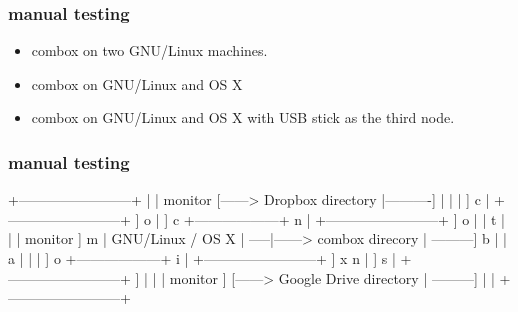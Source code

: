 \begin{frame}
  \frametitle{manual testing}
  \begin{itemize}
  \item combox on two GNU/Linux machines.
  \item combox on GNU/Linux and OS X
  \item combox on GNU/Linux and OS X with USB stick as the third node.
  \end{itemize}
\end{frame}


\begin{frame}[fragile]
  \frametitle{manual testing}
  {\tiny
  \begin{semiverbatim}



                                   +------------------------+
                                   |                        | monitor
                            [------>   Dropbox directory    |----------]
                            |      |                        |          ]
                          c |      +------------------------+          ]
                          o |                                          ] c
  +------------------+    n |      +------------------------+          ] o
  |                  |    t |      |                        |  monitor ] m
  | GNU/Linux / OS X | -----|------>    combox direcory     | ---------] b
  |                  |    a |      |                        |          ] o
  +------------------+    i |      +------------------------+          ] x
                          n |                                          ]
                          s |      +------------------------+          ]
                            |      |                        |  monitor ]
                            [------> Google Drive directory | ---------]
                                   |                        |
                                   +------------------------+

  \end{semiverbatim} }
\end{frame}


